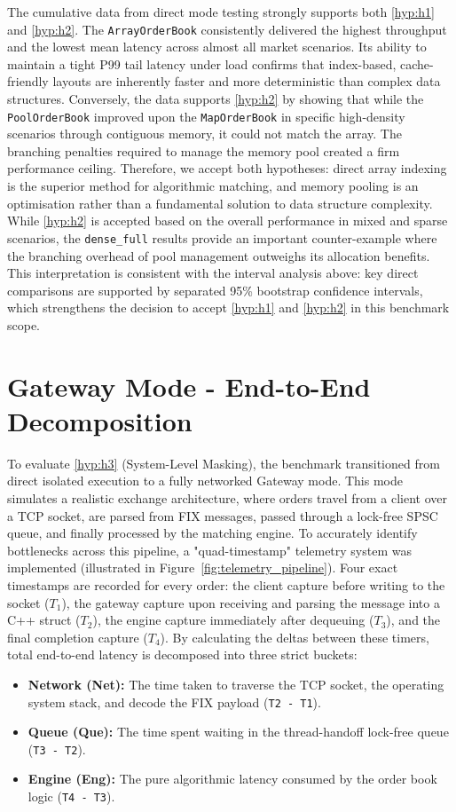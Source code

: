 The cumulative data from direct mode testing strongly supports both \ref{hyp:h1} 
and \ref{hyp:h2}. 
The \texttt{ArrayOrderBook} consistently delivered the highest throughput and 
the lowest mean latency across almost all market scenarios. 
Its ability to maintain a tight P99 tail latency under load confirms that 
index-based, cache-friendly layouts are inherently faster and more deterministic 
than complex data structures. 
Conversely, the data supports \ref{hyp:h2} by showing that while the 
\texttt{PoolOrderBook} improved upon the \texttt{MapOrderBook} in specific 
high-density scenarios through contiguous memory, it could not match the array. 
The branching penalties required to manage the memory pool created a firm 
performance ceiling. 
Therefore, we accept both hypotheses: direct array indexing is the superior 
method for algorithmic matching, and memory pooling is an optimisation rather 
than a fundamental solution to data structure complexity. While 
\ref{hyp:h2} is accepted based on the overall performance in mixed and 
sparse scenarios, the \texttt{dense\_full} results provide an 
important counter-example where the branching overhead of pool management 
outweighs its allocation benefits.
This interpretation is consistent with the interval analysis above: key direct
comparisons are supported by separated 95\% bootstrap confidence intervals, which strengthens the
decision to accept \ref{hyp:h1} and \ref{hyp:h2} in this benchmark scope.

\section{Gateway Mode - End-to-End Decomposition}
\label{sec:gateway_decomposition}

To evaluate \ref{hyp:h3} (System-Level Masking), the benchmark transitioned from 
direct isolated execution to a fully networked Gateway mode. 
This mode simulates a realistic exchange architecture, where orders travel 
from a client over a TCP socket, are parsed from FIX messages, passed through 
a lock-free SPSC queue, and finally processed by the matching engine. 
To accurately identify bottlenecks across this pipeline, a "quad-timestamp" 
telemetry system was implemented (illustrated in Figure~\ref{fig:telemetry_pipeline}). 
Four exact timestamps are recorded for every order: the client capture before 
writing to the socket ($T_1$), the gateway capture upon 
receiving and parsing the message into a C++ struct ($T_2$), the engine capture 
immediately after dequeuing ($T_3$), and the final completion 
capture ($T_4$). 
By calculating the deltas between these timers, total end-to-end latency is 
decomposed into three strict buckets:
\begin{itemize}
    \item \textbf{Network (Net):} The time taken to traverse the TCP socket, the 
    operating system stack, and decode the FIX payload (\texttt{T2 - T1}).
    \item \textbf{Queue (Que):} The time spent waiting in the thread-handoff lock-free queue (\texttt{T3 - T2}).
    \item \textbf{Engine (Eng):} The pure algorithmic latency consumed by the order book logic (\texttt{T4 - T3}).
\end{itemize}


